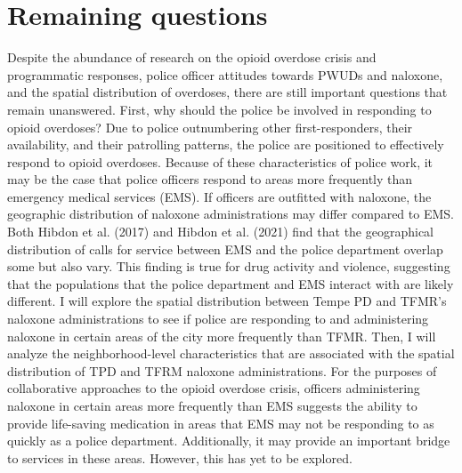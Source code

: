 \section{Remaining questions}
	
Despite the abundance of research on the opioid overdose crisis and programmatic responses, police officer attitudes towards PWUDs and naloxone, and the spatial distribution of overdoses, there are still important questions that remain unanswered. First, why should the police be involved in responding to opioid overdoses? Due to police outnumbering other first-responders, their availability, and their patrolling patterns, the police are positioned to effectively respond to opioid overdoses. Because of these characteristics of police work, it may be the case that police officers respond to areas more frequently than emergency medical services (EMS). If officers are outfitted with naloxone, the geographic distribution of naloxone administrations may differ compared to EMS. Both Hibdon et al. (2017) and Hibdon et al. (2021) find that the geographical distribution of calls for service between EMS and the police department overlap some but also vary. This finding is true for drug activity and violence, suggesting that the populations that the police department and EMS interact with are likely different. I will explore the spatial distribution between Tempe PD and TFMR’s naloxone administrations to see if police are responding to and administering naloxone in certain areas of the city more frequently than TFMR. Then, I will analyze the neighborhood-level characteristics that are associated with the spatial distribution of TPD and TFRM naloxone administrations. For the purposes of collaborative approaches to the opioid overdose crisis, officers administering naloxone in certain areas more frequently than EMS suggests the ability to provide life-saving medication in areas that EMS may not be responding to as quickly as a police department. Additionally, it may provide an important bridge to services in these areas. However, this has yet to be explored.

